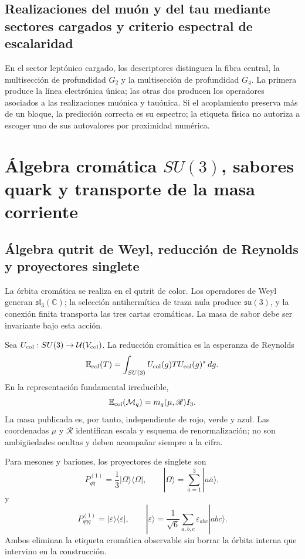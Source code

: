\subsection{Realizaciones del muón y del tau mediante sectores cargados y criterio espectral de escalaridad}

En el sector leptónico cargado, los descriptores distinguen la fibra central,
la multisección de profundidad \(G_2\) y la multisección de profundidad
\(G_4\). La primera produce la línea electrónica única; las otras dos
producen los operadores asociados a las realizaciones muónica y tauónica. Si
el acoplamiento preserva más de un bloque, la predicción correcta es su
espectro; la etiqueta física no autoriza a escoger uno de sus autovalores por
proximidad numérica.

\section{Álgebra cromática \texorpdfstring{\(SU(3)\)}{SU(3)}, sabores quark y transporte de la masa corriente}

\subsection{Álgebra qutrit de Weyl, reducción de Reynolds y proyectores singlete}

La órbita cromática se realiza en el qutrit de color. Los operadores de Weyl
generan \(\mathfrak{sl}_3(\mathbb C)\); la selección antihermítica de traza
nula produce \(\mathfrak{su}(3)\), y la conexión finita transporta las tres
cartas cromáticas. La masa de sabor debe ser invariante bajo esta acción.

Sea \(U_{\rm col}:SU(3)\to\mathcal U(V_{\rm col})\). La reducción cromática
es la esperanza de Reynolds
\[
 \mathbb E_{\rm col}(T)
 =\int_{SU(3)}U_{\rm col}(g)T U_{\rm col}(g)^*\,dg.
\]
En la representación fundamental irreducible,
\[
 \mathbb E_{\rm col}(\mathcal M_q)
 =m_q(\mu,\mathscr R)I_3.
\]
La masa publicada es, por tanto, independiente de rojo, verde y azul. Las
coordenadas \(\mu\) y \(\mathscr R\) identifican escala y esquema de
renormalización; no son ambigüedades ocultas y deben acompañar siempre a la
cifra.

Para mesones y bariones, los proyectores de singlete son
\[
 P_{q\bar q}^{(1)}
 =\frac1{3}|\Omega\rangle\langle\Omega|,
 \qquad
 |\Omega\rangle=\sum_{a=1}^{3}|a\bar a\rangle,
\]
y
\[
 P_{qqq}^{(1)}
 =|\varepsilon\rangle\langle\varepsilon|,
 \qquad
 |\varepsilon\rangle
 =\frac1{\sqrt6}\sum_{a,b,c}\varepsilon_{abc}|abc\rangle.
\]
Ambos eliminan la etiqueta cromática observable sin borrar la órbita interna
que intervino en la construcción.

